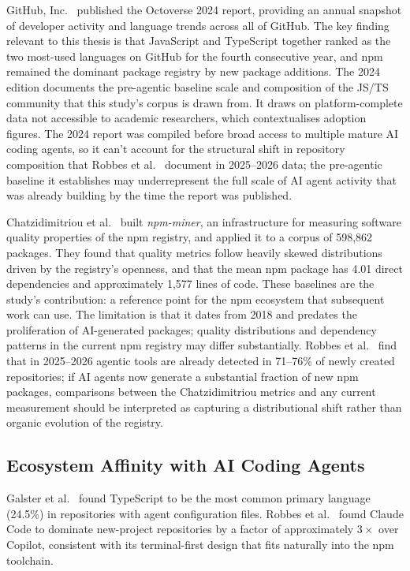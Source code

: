 GitHub, Inc.~\cite{octoverse2024} published the Octoverse 2024 report, providing
an annual snapshot of developer activity and language trends across all of GitHub.
The key finding relevant to this thesis is that JavaScript and TypeScript together
ranked as the two most-used languages on GitHub for the fourth consecutive year, and
npm remained the dominant package registry by new package additions. The 2024 edition
documents the pre-agentic baseline scale and composition of the JS/TS community that
this study's corpus is drawn from. It draws on platform-complete data not accessible
to academic researchers, which contextualises adoption figures. The 2024 report was
compiled before broad access to multiple mature AI coding agents, so it can't account
for the structural shift in repository composition that Robbes et
al.~\cite{robbesAgenticVery2026} document in 2025--2026 data; the pre-agentic
baseline it establishes may underrepresent the full scale of AI agent activity that
was already building by the time the report was published.

Chatzidimitriou et al.~\cite{chatzidimitriou2018} built \emph{npm-miner}, an
infrastructure for measuring software quality properties of the npm registry,
and applied it to a corpus of 598,862 packages. They found that quality metrics
follow heavily skewed distributions driven by the registry's openness, and that the
mean npm package has 4.01 direct dependencies and approximately 1,577 lines of code.
These baselines are the study's contribution: a reference point for the npm ecosystem
that subsequent work can use. The limitation is that it dates from 2018 and predates
the proliferation of AI-generated packages; quality distributions and dependency
patterns in the current npm registry may differ substantially. Robbes et
al.~\cite{robbesAgenticVery2026} find that in 2025--2026 agentic tools are already
detected in 71--76\% of newly created repositories; if AI agents now generate a
substantial fraction of new npm packages, comparisons between the Chatzidimitriou
metrics and any current measurement should be interpreted as capturing a distributional
shift rather than organic evolution of the registry.

\subsection{Ecosystem Affinity with AI Coding Agents}

Galster et al.~\cite{galsterConfig2026} found TypeScript to be the most common
primary language (24.5\%) in repositories with agent configuration files.
Robbes et al.~\cite{robbesAgenticVery2026} found Claude Code to dominate new-project
repositories by a factor of approximately $3\times$ over Copilot, consistent with
its terminal-first design that fits naturally into the npm toolchain.

